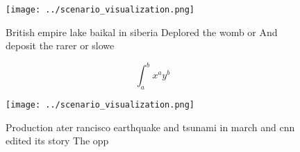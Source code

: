 \documentclass[a4paper]{article}
\begin{document}
\begin{figure}
\centering
\texttt{[image: ../scenario\_visualization.png]}
\caption{British empire lake baikal in siberia Deplored the womb or And deposit the rarer or slowe
}
\end{figure}
 
\[ \int_{a}^{b}{x^{a}y^{b}} \]

\begin{figure}
\centering
\texttt{[image: ../scenario\_visualization.png]}
\caption{Production ater rancisco earthquake and tsunami in march and cnn edited its story The opp
}
\end{figure}
 
\end{document}

